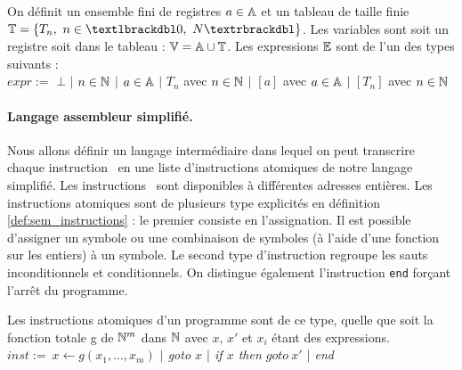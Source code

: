 \begin{defi}
On définit un ensemble fini de registres $a\in\mathbb A$ et un tableau de taille finie $\BT=\{T_n,\ n\in\textlbrackdbl 0,\ N\textrbrackdbl\}$. Les variables sont soit un registre soit dans le tableau : $\mathbb V=\mathbb A\cup\mathbb T$.
Les expressions $\mathbb E$ sont de l'un des types suivants :\\
$expr:=$ $\bot$ $|$ $n\in\mathbb N$ $|$ $a\in\mathbb A$ $|$ $T_n$ avec $n\in\mathbb N$ $|$ $[a]$ avec $a\in\mathbb A$ $|$ $[T_n]$ avec $n\in\mathbb N$
\label{def:sem_conc_var}
\end{defi}


\paragraph{Langage assembleur simplifié.} Nous allons définir un langage intermédiaire dans lequel on peut transcrire chaque instruction \xq\ en une liste d'instructions atomiques de notre langage simplifié.
Les instructions \xq\ sont disponibles à différentes adresses entières. 
Les instructions atomiques sont de plusieurs type explicités en définition \ref{def:sem_instructions} : le premier consiste en l'assignation.
Il est possible d'assigner un symbole ou une combinaison de symboles (à l'aide d'une fonction sur les entiers) à un symbole. 
Le second type d'instruction regroupe les sauts inconditionnels et conditionnels.
On distingue également l'instruction \texttt{end} forçant l'arrêt du programme.

\begin{defi}
Les instructions atomiques d'un programme sont de ce type, quelle que soit la fonction totale g de $\mathbb N^m$ dans $\mathbb N$ avec $x$, $x'$ et $x_i$ étant des expressions.\\
$inst:=\ $\emph{$x\leftarrow g(x_1, ..., x_m)$ $|$ goto $x$ $|$ if $x$ then $goto\ x'$ $|$ end}
\label{def:sem_instructions}
\end{defi}


